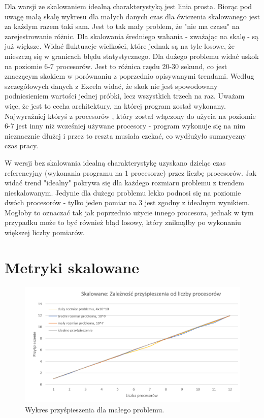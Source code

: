 \documentclass[10pt,english, openany]{book}
\begin{document}
Dla warsji ze skalowaniem idealną charakterystyką jest linia prosta. Biorąc pod uwagę małą skalę wykresu dla małych danych czas dla ćwiczenia skalowanego jest za każdym razem taki sam. Jest to tak mały problem, że "nie ma czasu" na zarejestrowanie różnic. Dla skalowania średniego wahania - zważając na skalę - są już większe. Widać fluktuacje wielkości, które jednak są na tyle losowe, że mieszczą się w granicach błędu statystycznego. Dla dużego problemu widać uskok na poziomie 6-7 procesorów. Jest to różnica rzędu 20-30 sekund, co jest znaczącym skokiem w porównaniu z poprzednio opisywanymi trendami. Według szczegółowych danych z Excela widać, że skok nie jest spowodowany podniesieniem wartości jednej próbki, lecz wszystkich trzech na raz. Uważam więc, że jest to cecha architektury, na której program został wykonany. Najwyraźniej któryś z procesorów , który został włączony do użycia na poziomie 6-7 jest inny niż wcześniej używane procesory - program wykonuje się na nim nieznacznie dłużej i przez to reszta musiała czekać, co wydłużyło sumaryczny czas pracy.

W wersji bez skalowania idealną charakterystykę uzyskano dzieląc czas referencyjny (wykonania programu na 1 procesorze) przez liczbę procesorów. Jak widać trend "idealny" pokrywa się dla każdego rozmiaru problemu z trendem nieskalowanym. Jedynie dla dużego problemu lekko podnosi się na poziomie dwóch procesorów - tylko jeden pomiar na 3 jest zgodny z idealnym wynikiem. Mogłoby to oznaczać tak jak poprzednio użycie innego procesora, jednak w tym przypadku może to być również błąd losowy, który zniknąłby po wykonaniu większej liczby pomiarów.
\section{Metryki skalowane}

\begin{figure}[H]
\centering
\includegraphics[scale=0.9]{pics/Sk_speedup.png}
\caption{Wykres przyśpieszenia dla małego problemu.}
\end{figure}
\end{document}
